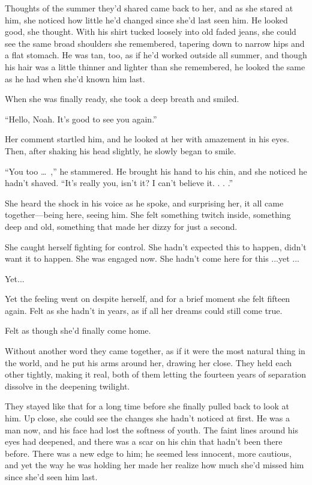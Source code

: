 \documentclass[10pt, twoside, openright]{book}
\begin{document}
Thoughts of the summer they'd shared came back to her, and as she stared
at him, she noticed how little he'd changed since she'd last seen him.
He looked good, she thought. With his shirt tucked loosely into old
faded jeans, she could see the same broad shoulders she remembered,
tapering down to narrow hips and a flat stomach. He was tan, too, as if
he'd worked outside all summer, and though his hair was a little thinner
and lighter than she remembered, he looked the same as he had when she'd
known him last.


When she was finally ready, she took a deep breath and smiled.

``Hello, Noah. It's good to see you again.''


Her comment startled him, and he looked at her with amazement in his
eyes. Then, after shaking his head slightly, he slowly began to smile.

``You too   \dots\ ,'' he stammered. He brought his hand to his chin, and
she noticed he hadn't shaved. ``It's really you, isn't it? I can't
believe it. . . .''

She heard the shock in his voice as he spoke, and surprising her, it all
came together---being here, seeing him. She felt something twitch
inside, something deep and old, something that made her dizzy for just a
second.

She caught herself fighting for control. She hadn't expected this to
happen, didn't want it to happen. She was engaged now. She hadn't come
here for this ...yet ...


Yet...


Yet the feeling went on despite herself, and for a brief moment she felt
fifteen again. Felt as she hadn't in years, as if all her dreams could
still come true.


Felt as though she'd finally come home.


Without another word they came together, as if it were the most natural
thing in the world, and he put his arms around her, drawing her close.
They held each other tightly, making it real, both of them letting the
fourteen years of separation dissolve in the deepening twilight.

They stayed like that for a long time before she finally pulled back to
look at him. Up close, she could see the changes she hadn't noticed at
first. He was a man now, and his face had lost the softness of youth.
The faint lines around his eyes had deepened, and there was a scar on
his chin that hadn't been there before. There was a new edge to him; he
seemed less innocent, more cautious, and yet the way he was holding her
made her realize how much she'd missed him since she'd seen him last.
\end{document}
